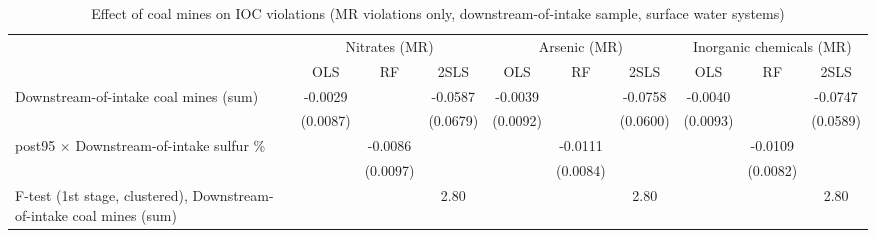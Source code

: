
\begin{table}[htbp]
   
   \caption{\label{2sls_placebo_dwnstrmintake_minevio_mr_ivsum_binvio_surfacewater} Effect of coal mines on IOC violations (MR violations only, downstream-of-intake sample, surface water systems)}
   \bigskip
   
   \centering
   
   \begin{adjustbox}{width = \textwidth, center}
      
      
      \begin{tabular}{lccccccccc}
         \toprule
         
          & \multicolumn{3}{c}{Nitrates (MR)} & \multicolumn{3}{c}{Arsenic (MR)} & \multicolumn{3}{c}{Inorganic chemicals (MR)}\\
         
                                                                              & OLS           & RF            & 2SLS          & OLS           & RF            & 2SLS          & OLS           & RF            & 2SLS\\  
         
         \midrule 
         Downstream-of-intake coal mines (sum)                                & -0.0029       &               & -0.0587       & -0.0039       &               & -0.0758       & -0.0040       &               & -0.0747\\   
                                                                              & (0.0087)      &               & (0.0679)      & (0.0092)      &               & (0.0600)      & (0.0093)      &               & (0.0589)\\   
         post95 $\times$ Downstream-of-intake sulfur \%                       &               & -0.0086       &               &               & -0.0111       &               &               & -0.0109       &   \\   
                                                                              &               & (0.0097)      &               &               & (0.0084)      &               &               & (0.0082)      &   \\   
         
         F-test (1st stage, clustered), Downstream-of-intake coal mines (sum) &               &               & 2.80          &               &               & 2.80          &               &               & 2.80\\  
         

\end{tabular}
\end{adjustbox}
\end{table}
